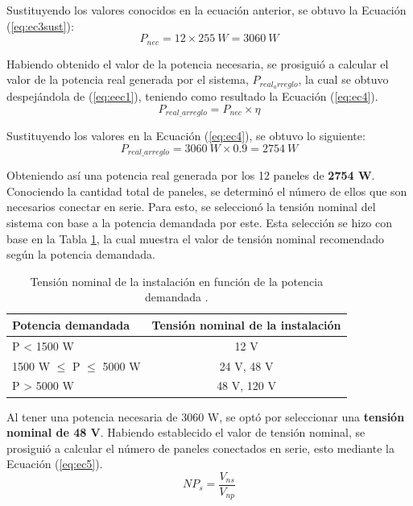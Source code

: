 Sustituyendo los valores conocidos en la ecuación anterior, se obtuvo la Ecuación (\ref{eq:ec3sust}):
\begin{equation}\label{eq:ec3sust}
P_{nec} = 12 \times 255 \ W = 3060 \ W
\end{equation}

Habiendo obtenido el valor de la potencia necesaria, se prosiguió a calcular el valor de la potencia real generada por el sistema, $P_{real_arreglo}$, la cual se obtuvo despejándola de (\ref{eq:eec1}), teniendo como resultado la Ecuación (\ref{eq:ec4}).
\begin{equation}\label{eq:ec4}
P_{real\_arreglo} = P_{nec}  \times  \eta
\end{equation}

Sustituyendo los valores en la Ecuación (\ref{eq:ec4}), se obtuvo lo siguiente:
\begin{equation}\label{eq:ec4sust}
P_{real\_arreglo} = 3060 \ W \times 0.9 = 2754 \ W
\end{equation}

Obteniendo así una potencia real generada por los 12 paneles de \textbf{2754 W}.\\

Conociendo la cantidad total de paneles, se determinó el número de ellos que son necesarios conectar en serie. Para esto, se seleccionó la tensión nominal del sistema con base a la potencia demandada por este. Esta selección se hizo con base en la Tabla \ref{tab:Tensionnom}, la cual muestra el valor de tensión nominal recomendado según la potencia demandada.

\begin{table}[H]
	\centering
	\caption{Tensión nominal de la instalación en función de la potencia demandada \cite{DDE2}.}
	\begin{tabular}{|l|c|}
		\hline
		\multicolumn{1}{|p{10.57em}|}{\textbf{Potencia demandada}} & \multicolumn{1}{p{12.285em}|}{\textbf{Tensión nominal de la instalación}} \\
		\hline
		P < 1500 W & 12 V \\
		\hline
		1500 W $\leq$ P $\leq$ 5000 W & 24 V, 48 V \\
		\hline
		P > 5000 W & 48 V, 120 V \\
		\hline
	\end{tabular}%
	\label{tab:Tensionnom}%
\end{table}%

Al tener una potencia necesaria de 3060 W, se optó por seleccionar una \textbf{tensión nominal de 48 V}. Habiendo establecido el valor de tensión nominal, se prosiguió a calcular el número de paneles conectados en serie, esto mediante la Ecuación (\ref{eq:ec5}).
\begin{equation}\label{eq:ec5}
NP_{s} = \frac{V_{ns}}{V_{np}} 
\end{equation}

